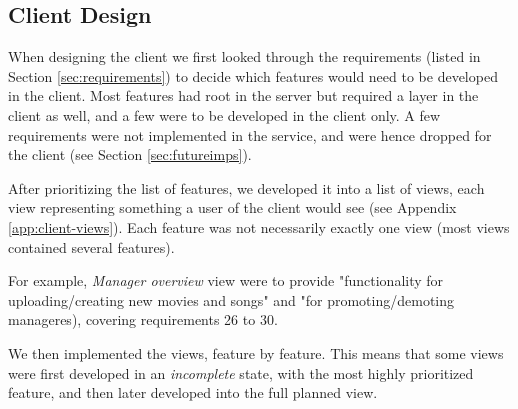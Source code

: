 \subsection{Client Design}

When designing the client we first looked through the requirements (listed in
Section \ref{sec:requirements}) to decide which features would need to be
developed in the client. Most features had root in the server but required a
layer in the client as well, and a few were to be developed in the client only.
A few requirements were not implemented in the service, and were hence dropped
for the client (see Section \ref{sec:futureimps}).

After prioritizing the list of features, we developed it into a list of views,
each view representing something a user of the client would see (see Appendix
\ref{app:client-views}). Each feature was not necessarily exactly one view (most
views contained several features).

For example, \emph{Manager overview} view were to provide "functionality for
uploading/creating new movies and songs" and "for promoting/demoting
manageres), covering requirements 26 to 30.

We then implemented the views, feature by feature. This means that some views
were first developed in an \emph{incomplete} state, with the most highly
prioritized feature, and then later developed into the full planned view.


